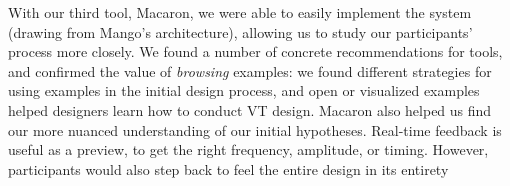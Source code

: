 With our third tool, Macaron, we were able to easily implement the system (drawing from Mango's architecture), allowing us to study our participants' process more closely.
We found a number of concrete recommendations for \haxd tools, and confirmed the value of \emph{browsing} examples: we found different strategies for using examples in the initial design process, and open or visualized examples helped designers learn how to conduct VT design.
 Macaron also helped us find our more nuanced understanding of our initial hypotheses. Real-time feedback is useful as a preview, to get the right frequency, amplitude, or timing. However, participants would also step back to feel the entire design in its entirety

